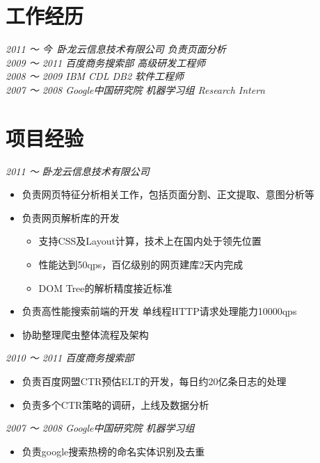 \documentclass[margin, 10pt]{res} %
\begin{document}
\begin{resume}
\section{工作经历}
{\sl 2011 ～  今\  卧龙云信息技术有限公司 负责页面分析}   \\
{\sl 2009 ～ 2011 百度商务搜索部 高级研发工程师}  \\
{\sl 2008 ～ 2009 IBM CDL  DB2 软件工程师} \\
{\sl 2007 ～ 2008 Google中国研究院 机器学习组 Research Intern} \\

\section{项目经验}
{\sl 2011 ～  卧龙云信息技术有限公司}   \\
\begin{itemize} \itemsep -2pt %
\item 负责网页特征分析相关工作，包括页面分割、正文提取、意图分析等
\item 负责网页解析库的开发
  \begin{itemize}
    \item 支持CSS及Layout计算，技术上在国内处于领先位置
    \item 性能达到50qps，百亿级别的网页建库2天内完成
    \item DOM Tree的解析精度接近标准
  \end{itemize}
\item 负责高性能搜索前端的开发 单线程HTTP请求处理能力10000qps
\item 协助整理爬虫整体流程及架构
\end{itemize}
 
{\sl 2010 ～ 2011 百度商务搜索部}  \\
\begin{itemize} 
\item 负责百度网盟CTR预估ELT的开发，每日约20亿条日志的处理
\item 负责多个CTR策略的调研，上线及数据分析
\end{itemize} 

{\sl 2007 ～ 2008 Google中国研究院  机器学习组} \\
\begin{itemize}
  \item 负责google搜索热榜的命名实体识别及去重
\end{itemize}


\end{resume}
\end{document}
